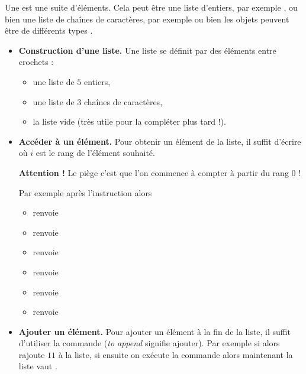 \documentclass[11pt,class=report,crop=false]{standalone}
\begin{document}
\begin{cours}[Liste (1)]

Une  est une suite d'éléments. Cela peut être une liste d'entiers, par exemple \ci{[5,-7,12,99]}, ou bien une liste de chaînes de caractères, par exemple  ou bien les objets peuvent être de différents types \ci{[3.14,"pi",10e-3,"x",True]}.

\begin{itemize}
  \item \textbf{Construction d'une liste.} Une liste se définit par des éléments entre crochets :
  \begin{itemize}
    \item {} une liste de $5$ entiers,
    \item {} une liste de $3$ chaînes de caractères,
    \item {} la liste vide (très utile pour la compléter plus tard  !).
  \end{itemize}

  \item \textbf{Accéder à un élément.} Pour obtenir un élément de la liste, il suffit d'écrire  où $i$ est le rang de l'élément souhaité. 
  
  \textbf{Attention !} Le piège c'est que l'on commence à compter à partir du rang $0$ ! 
  
  Par exemple après l'instruction  alors  
  \begin{itemize}
    \item {} renvoie 
    \item {} renvoie 
    \item {} renvoie 
    \item {} renvoie 
    \item {} renvoie 
    \item {} renvoie                    
  \end{itemize}  
  
  \medskip
  

  
  \item \textbf{Ajouter un élément.} Pour ajouter un élément à la fin de la liste, il suffit d'utiliser la commande  (\emph{to append} signifie \og{}ajouter\fg{}). 
  Par exemple si  alors 
   rajoute $11$ à la liste, si ensuite on exécute  la commande  alors maintenant la liste  vaut \ci{[2,3,5,7,11,13]}.
  

\end{itemize}
\end{cours}
\end{document}
